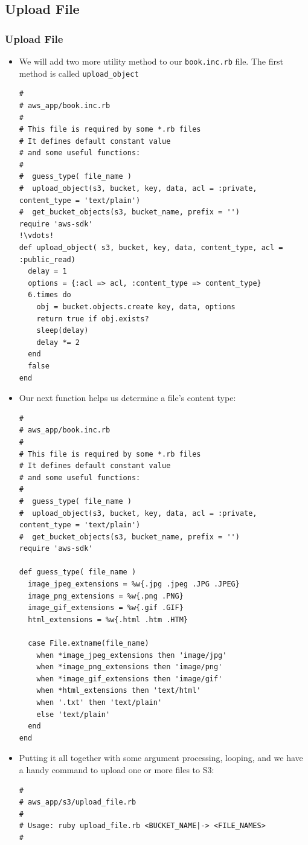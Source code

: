 \documentclass{beamer}
\begin{document}
\subsection{Upload File}
\begin{frame}
\frametitle{Upload File}
\begin{itemize}
 \item We will add two more utility method to our \texttt{book.inc.rb} file. The first method is called \texttt{upload\_object}

\lstset{language=Ruby, style=eclipse}
\begin{lstlisting}[escapechar=!]
#
# aws_app/book.inc.rb
#
# This file is required by some *.rb files
# It defines default constant value
# and some useful functions:
#
#  guess_type( file_name )
#  upload_object(s3, bucket, key, data, acl = :private, content_type = 'text/plain')
#  get_bucket_objects(s3, bucket_name, prefix = '')
require 'aws-sdk'
!\vdots!
def upload_object( s3, bucket, key, data, content_type, acl = :public_read)
  delay = 1
  options = {:acl => acl, :content_type => content_type}
  6.times do
    obj = bucket.objects.create key, data, options
    return true if obj.exists?
    sleep(delay)
    delay *= 2
  end
  false
end
\end{lstlisting}

\item Our next function helps us determine a file's content type:

\lstset{language=Ruby, style=eclipse}
\begin{lstlisting}[escapechar=!]
#
# aws_app/book.inc.rb
#
# This file is required by some *.rb files
# It defines default constant value
# and some useful functions:
#
#  guess_type( file_name )
#  upload_object(s3, bucket, key, data, acl = :private, content_type = 'text/plain')
#  get_bucket_objects(s3, bucket_name, prefix = '')
require 'aws-sdk'

def guess_type( file_name )
  image_jpeg_extensions = %w{.jpg .jpeg .JPG .JPEG}
  image_png_extensions = %w{.png .PNG}
  image_gif_extensions = %w{.gif .GIF}
  html_extensions = %w{.html .htm .HTM}

  case File.extname(file_name)
    when *image_jpeg_extensions then 'image/jpg'
    when *image_png_extensions then 'image/png'
    when *image_gif_extensions then 'image/gif'
    when *html_extensions then 'text/html'
    when '.txt' then 'text/plain'
    else 'text/plain'
  end
end
\end{lstlisting}
\item Putting it all together with some argument processing, looping, and
we have a handy command to upload one or more files to S3:
\lstset{language=Ruby, style=eclipse}
\begin{lstlisting}[escapechar=!]
#
# aws_app/s3/upload_file.rb
#
# Usage: ruby upload_file.rb <BUCKET_NAME|-> <FILE_NAMES>
#


\end{lstlisting}
\end{itemize}
\end{frame}
\end{document}
